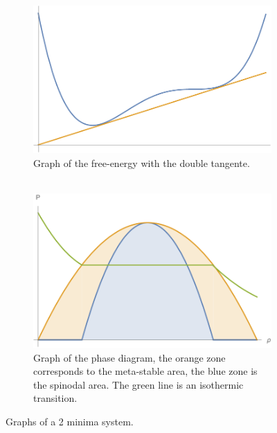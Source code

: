 \documentclass[10pt,a4paper]{book}
\begin{document}
\begin{figure}[h!]
     \centering
     \begin{subfigure}[b]{0.47\textwidth}
         \centering
         \includegraphics[width=\textwidth]{graphs/double_tangente}
         \caption{Graph of the free-energy with the double tangente.\\ \quad \\ \quad}
     \end{subfigure}
     \hfill
     \begin{subfigure}[b]{0.47\textwidth}
         \centering
         \includegraphics[width=\textwidth]{graphs/double_tangente_phase_diagram}
         \caption{Graph of the phase diagram, the orange zone corresponds to the meta-stable area, the blue zone is the spinodal area. The green line is an isothermic transition.}
     \end{subfigure}
        \caption{Graphs of a 2 minima system.}
\end{figure}
\end{document}
